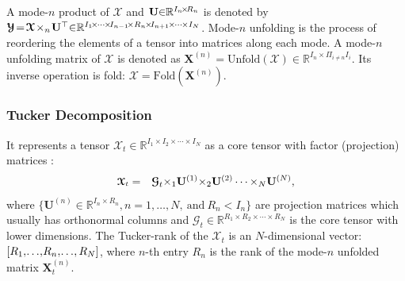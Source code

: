 \documentclass[letterpaper]{article} %
\numberwithin{theorem}{section}
\newcommand{\ten}[1]{ \boldsymbol{\mathcal #1}}
\begin{document}
A mode-$n$ product of  $\ten{X}$ and   $  \mathbf U\hspace{-0.1cm} \in\hspace{-0.1cm} \mathbb{R}^{I_n\hspace{-0.05cm} \times \hspace{-0.05cm}R_n}$   is denoted by  $ \ten{Y} \hspace{-0.05cm} = \hspace{-0.05cm} \ten{X} \hspace{-0.05cm} \times_n \hspace{-0.05cm} \mathbf U^\top \hspace{-0.09cm}\in \hspace{-0.09cm}\mathbb{R}^{I_1 \hspace{-0.05cm} \times \hspace{-0.025cm} \cdots \hspace{-0.025cm} \times \hspace{-0.05cm} I_{n-1} \hspace{-0.05cm} \times R_n \hspace{-0.03cm}  \times\hspace{-0.05cm}  I_{n+1} \hspace{-0.025cm}  \times \hspace{-0.025cm} \cdots \hspace{-0.025cm} \times I_N}$.
Mode-$n$ unfolding is the process of reordering the elements of a tensor	into matrices along each mode. A mode-$n$ unfolding matrix of  $\ten{X}$ is denoted as $\mathbf X^{(n)}  = \text{Unfold} (\ten{X})  \in \mathbb{R}^{I_n \times \Pi_{i \neq n} I_{i}  }$. Its inverse operation is fold: $\ten{X}  = \text{Fold} (\mathbf X^{(n)})$.


\subsubsection{Tucker Decomposition}
It represents 
a  tensor  $\ten{X}_t \in \mathbb{R}^{I_1 \times I_2  \times \cdots  \times I_N}$   as a core tensor with factor (projection) matrices \cite{kolda2009tensor}: 
\begin{equation}
\begin{aligned}
\small
\label{TuckerModel0}
\ten{X}_t &   =  &
\ten{G}_t {\times_1} \mathbf{U}^{(1)}  {\times_2}  \mathbf{U}^{(2)}  \cdots {\times_N} \mathbf{U}^{(N)},
\end{aligned}
\end{equation}
where $ \{\mathbf{U}^{(n)}  \in \mathbb{R}^{I_n \times  R_n}, n= 1,  \ldots, N, \ \text{and} \ R_n < I_n \}$
are projection  matrices which usually has orthonormal columns and $\ten{G}_t \in \mathbb{R}^{R_1 \times R_2 \times  \cdots \times R_N}$ is the core tensor with lower dimensions. 
The {Tucker-rank} of the  $\ten{X}_t$ is an $N$-dimensional vector: $[R_1, \hspace{-0.05cm} \ldots \hspace{-0.05cm}, \hspace{-0.05cm} R_n,  \hspace{-0.05cm}\ldots \hspace{-0.05cm}, R_N]$, where $n$-th entry $R_n$ is the rank of the mode-$n$ unfolded matrix $\mathbf{X}{_t^{(n)}}$.  
\end{document}
